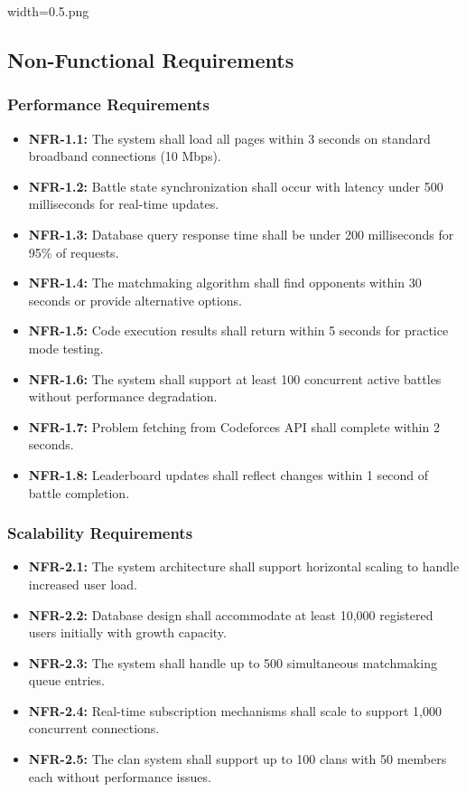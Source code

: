 width=0.5\linewidthimage.png\documentclass[12pt,a4paper]{article}
\begin{document}
\subsection{Non-Functional Requirements}

\subsubsection{Performance Requirements}
\begin{itemize}
\item \textbf{NFR-1.1:} The system shall load all pages within 3 seconds on standard broadband connections (10 Mbps).
\item \textbf{NFR-1.2:} Battle state synchronization shall occur with latency under 500 milliseconds for real-time updates.
\item \textbf{NFR-1.3:} Database query response time shall be under 200 milliseconds for 95\% of requests.
\item \textbf{NFR-1.4:} The matchmaking algorithm shall find opponents within 30 seconds or provide alternative options.
\item \textbf{NFR-1.5:} Code execution results shall return within 5 seconds for practice mode testing.
\item \textbf{NFR-1.6:} The system shall support at least 100 concurrent active battles without performance degradation.
\item \textbf{NFR-1.7:} Problem fetching from Codeforces API shall complete within 2 seconds.
\item \textbf{NFR-1.8:} Leaderboard updates shall reflect changes within 1 second of battle completion.
\end{itemize}

\subsubsection{Scalability Requirements}
\begin{itemize}
\item \textbf{NFR-2.1:} The system architecture shall support horizontal scaling to handle increased user load.
\item \textbf{NFR-2.2:} Database design shall accommodate at least 10,000 registered users initially with growth capacity.
\item \textbf{NFR-2.3:} The system shall handle up to 500 simultaneous matchmaking queue entries.
\item \textbf{NFR-2.4:} Real-time subscription mechanisms shall scale to support 1,000 concurrent connections.
\item \textbf{NFR-2.5:} The clan system shall support up to 100 clans with 50 members each without performance issues.
\end{itemize}
\end{document}
